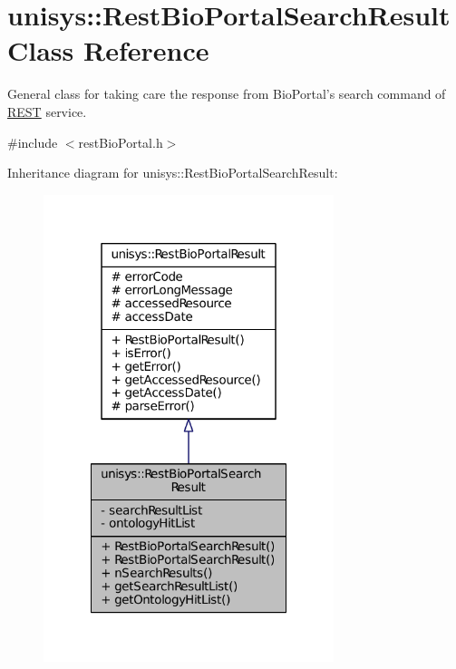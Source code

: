 \hypertarget{classunisys_1_1RestBioPortalSearchResult}{\section{unisys\-:\-:Rest\-Bio\-Portal\-Search\-Result Class Reference}
\label{classunisys_1_1RestBioPortalSearchResult}
}


General class for taking care the response from Bio\-Portal's search command of \hyperlink{classunisys_1_1REST}{R\-E\-S\-T} service.  




{\ttfamily \#include $<$rest\-Bio\-Portal.\-h$>$}



Inheritance diagram for unisys\-:\-:Rest\-Bio\-Portal\-Search\-Result\-:
\nopagebreak
\begin{figure}[H]
\begin{center}
\leavevmode
\includegraphics[width=240pt]{classunisys_1_1RestBioPortalSearchResult__inherit__graph}
\end{center}
\end{figure}



